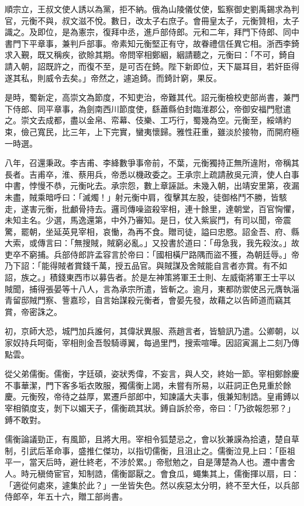 \begin{pinyinscope}
 順宗立，王叔文使人誘以為黨，拒不納。俄為山陵儀仗使，監察御史劉禹錫求為判官，元衡不與，叔文滋不悅。數日，改太子右庶子。會冊皇太子，元衡贊相，太子識之。及即位，是為憲宗，復拜中丞，進戶部侍郎。元和二年，拜門下侍郎、同中書門下平章事，兼判戶部事。帝素知元衡堅正有守，故眷禮信任異它相。浙西李錡求入覲，既又稱疾，欲賒其期。帝問宰相鄭絪，絪請聽之，元衡曰：「不可，錡自請入朝，詔既許之，而復不至，是可否在錡。陛下新即位，天下屬耳目，若奸臣得遂其私，則威令去矣。」帝然之，遽追錡。而錡計窮，果反。



 是時，蜀新定，高崇文為節度，不知吏治，帝難其代。詔元衡檢校吏部尚書，兼門下侍郎、同平章事，為劍南西川節度使，繇蕭縣伯封臨淮郡公，帝御安福門慰遣之。崇文去成都，盡以金帛、帟幕、伎樂、工巧行，蜀幾為空。元衡至，綏靖約束，儉己寬民，比三年，上下完實，蠻夷懷歸。雅性莊重，雖淡於接物，而開府極一時選。



 八年，召還秉政。李吉甫、李絳數爭事帝前，不葉，元衡獨持正無所違附，帝稱其長者。吉甫卒，淮、蔡用兵，帝悉以機政委之。王承宗上疏請赦吳元濟，使人白事中書，悖慢不恭，元衡叱去。承宗怨，數上章誣詆。未幾入朝，出靖安里第，夜漏未盡，賊乘暗呼曰：「滅燭！」射元衡中肩，復擊其左股，徒御格鬥不勝，皆駭走，遂害元衡，批顱骨持去。邏司傳噪盜殺宰相，連十餘里，達朝堂，百官恟懼，未知主名。少選，馬逸還第，中外乃審知。是日，仗入紫宸門，有司以聞，帝震驚，罷朝，坐延英見宰相，哀慟，為再不食。贈司徒，謚曰忠愍。詔金吾、府、縣大索，或傳言曰：「無搜賊，賊窮必亂。」又投書於道曰：「毋急我，我先殺汝。」故吏卒不窮捕。兵部侍郎許孟容言於帝曰：「國相橫尸路隅而盜不獲，為朝廷辱。」帝乃下詔：「能得賊者賞錢千萬，授五品官。與賊謀及舍賊能自言者亦賞。有不如詔，族之。」積錢東西市以募告者。於是左神策將軍王士則、左威衛將軍王士平以賊聞，捕得張晏等十八人，言為承宗所遣，皆斬之。逾月，東都防禦使呂元膺執淄青留邸賊門察、訾嘉珍，自言始謀殺元衡者，會晏先發，故藉之以告師道而竊其賞，帝密誅之。



 初，京師大恐，城門加兵誰何，其偉狀異服、燕趙言者，皆驗訊乃遣。公卿朝，以家奴持兵呵衛，宰相則金吾彀騎導翼，每過里門，搜索喧嘩。因詔寅漏上二刻乃傳點雲。



 從父弟儒衡。儒衡，字廷碩，姿狀秀偉，不妄言，與人交，終始一節。宰相鄭餘慶不事華潔，門下客多垢衣敗服，獨儒衡上謁，未嘗有所易，以莊詞正色見重於餘慶。元衡歿，帝待之益厚，累遷戶部郎中，知諫議大夫事，俄兼知制誥。皇甫鎛以宰相領度支，剝下以媚天子，儒衡疏其狀。鎛自訴於帝，帝曰：「乃欲報怨邪？」鎛不敢對。



 儒衡論議勁正，有風節，且將大用。宰相令狐楚忌之，會以狄兼謨為拾遺，楚自草制，引武后革命事，盛推仁傑功，以指切儒衡，且沮止之。儒衡泣見上曰：「臣祖平一，當天后時，避仕終老，不涉於累。」帝慰勉之，自是薄楚為人也。遷中書舍人。時元稹倚宦官，知制誥，儒衡鄙厭之。會食瓜，蠅集其上，儒衡揮以扇，曰：「適從何處來，遽集於此？」一坐皆失色。然以疾惡太分明，終不至大任，以兵部侍郎卒，年五十六，贈工部尚書。




\end{pinyinscope}
